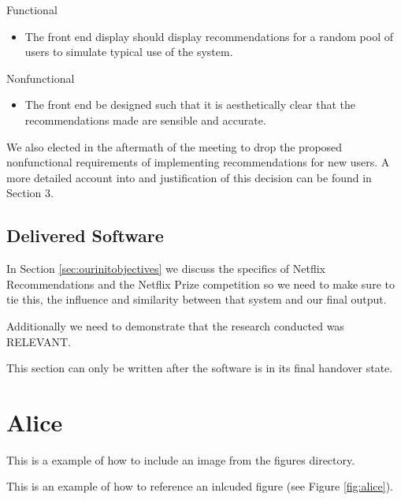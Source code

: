 \documentclass{l3proj}
\begin{document}
Functional
\begin{itemize}
\item The front end display should display recommendations for a random pool of users to simulate typical use of the system.
\end{itemize}

Nonfunctional
\begin{itemize}
\item The front end be designed such that it is aesthetically clear that the recommendations made are sensible and accurate.
\end{itemize}

We also elected in the aftermath of the meeting to drop the proposed nonfunctional requirements of implementing recommendations for new users. A more detailed account into and justification of this decision can be found in Section 3.

\subsection{Delivered Software}
\label{sec:finsoftware}

In Section \ref{sec:ourinitobjectives} we discuss the specifics of Netflix Recommendations and the Netflix Prize competition so we need to make sure to tie this, the influence and similarity between that system and our final output. 

Additionally we need to demonstrate that the research conducted was RELEVANT.

This section can only be written after the software is in its final handover state.
\newpage


\section{Alice}
\label{sec:alice}

This is a example of how to include an image from the figures directory.



This is an example of how to reference an inlcuded figure (see Figure \ref{fig:alice}).
\end{document}
